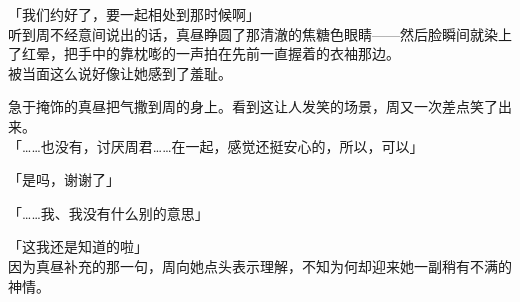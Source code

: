 「我们约好了，要一起相处到那时候啊」\\%

听到周不经意间说出的话，真昼睁圆了那清澈的焦糖色眼睛——然后脸瞬间就染上了红晕，把手中的靠枕嘭的一声拍在先前一直握着的衣袖那边。\\

被当面这么说好像让她感到了羞耻。

急于掩饰的真昼把气撒到周的身上。看到这让人发笑的场景，周又一次差点笑了出来。\\

「……也没有，讨厌周君……在一起，感觉还挺安心的，所以，可以」

「是吗，谢谢了」

「……我、我没有什么别的意思」

「这我还是知道的啦」\\

因为真昼补充的那一句，周向她点头表示理解，不知为何却迎来她一副稍有不满的神情。
